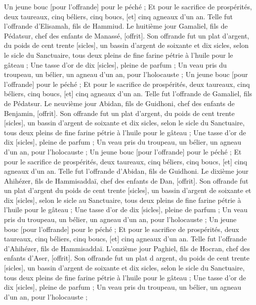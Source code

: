 \begin{multicols}{2}
Un jeune bouc [pour l'offrande] pour le péché ;
Et pour le sacrifice de prospérités, deux taureaux, cinq béliers, cinq boucs, [et] cinq agneaux d'un an. Telle fut l'offrande d'Elisamah, fils de Hammiud.
Le huitième jour Gamaliel, fils de Pédatsur, chef des enfants de Manassé, [offrit].
Son offrande fut un plat d'argent, du poids de cent trente [sicles], un bassin d'argent de soixante et dix sicles, selon le sicle du Sanctuaire, tous deux pleins de fine farine pétrie à l'huile pour le gâteau ;
Une tasse d'or de dix [sicles], pleine de parfum ;
Un veau pris du troupeau, un bélier, un agneau d'un an, pour l'holocauste ;
Un jeune bouc [pour l'offrande] pour le péché ;
Et pour le sacrifice de prospérités, deux taureaux, cinq béliers, cinq boucs, [et] cinq agneaux d'un an. Telle fut l'offrande de Gamaliel, fils de Pédatsur.
Le neuvième jour Abidan, fils de Guidhoni, chef des enfants de Benjamin, [offrit].
Son offrande fut un plat d'argent, du poids de cent trente [sicles], un bassin d'argent de soixante et dix sicles, selon le sicle du Sanctuaire, tous deux pleins de fine farine pétrie à l'huile pour le gâteau ;
Une tasse d'or de dix [sicles], pleine de parfum ;
Un veau pris du troupeau, un bélier, un agneau d'un an, pour l'holocauste ;
Un jeune bouc [pour l'offrande] pour le péché ;
Et pour le sacrifice de prospérités, deux taureaux, cinq béliers, cinq boucs, [et] cinq agneaux d'un an. Telle fut l'offrande d'Abidan, fils de Guidhoni.
Le dixième jour Ahihézer, fils de Hammisaddaï, chef des enfants de Dan, [offrit].
Son offrande fut un plat d'argent du poids de cent trente [sicles], un bassin d'argent de soixante et dix [sicles], selon le sicle au Sanctuaire, tous deux pleins de fine farine pétrie à l'huile pour le gâteau ;
Une tasse d'or de dix [sicles], pleine de parfum ;
Un veau pris du troupeau, un bélier, un agneau d'un an, pour l'holocauste ;
Un jeune bouc [pour l'offrande] pour le péché ;
Et pour le sacrifice de prospérités, deux taureaux, cinq béliers, cinq boucs, [et] cinq agneaux d'un an. Telle fut l'offrande d'Ahihézer, fils de Hammisaddaï.
L'onzième jour Paghiel, fils de Hocran, chef des enfants d'Aser, [offrit].
Son offrande fut un plat d argent, du poids de cent trente [sicles], un bassin d'argent de soixante et dix sicles, selon le sicle du Sanctuaire, tous deux pleins de fine farine pétrie à l'huile pour le gâteau ;
Une tasse d'or de dix [sicles], pleine de parfum ;
Un veau pris du troupeau, un bélier, un agneau d'un an, pour l'holocauste ;

\end{multicols}
